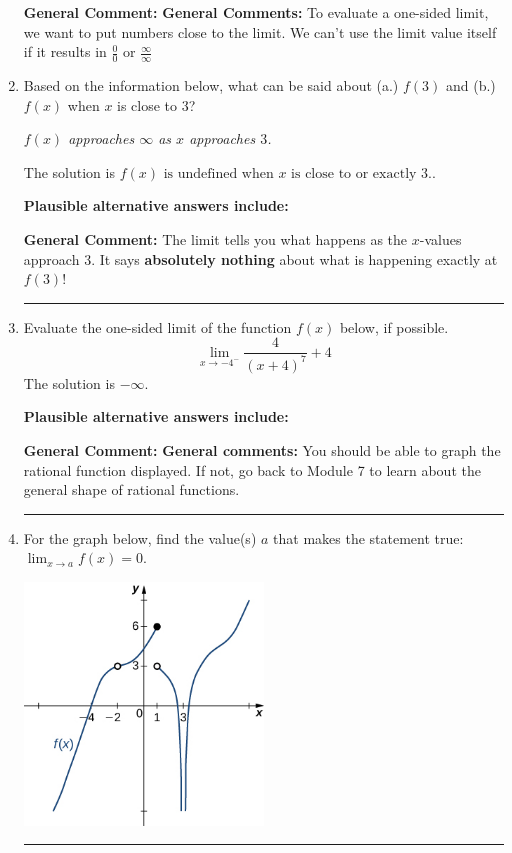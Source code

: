 \documentclass{extbook}[14pt]
\newcommand{\litem}[1]{\item #1

\rule{\textwidth}{0.4pt}}
\begin{document}
\begin{enumerate}
{\textbf{General Comment:} \textbf{General Comments:} To evaluate a one-sided limit, we want to put numbers close to the limit. We can't use the limit value itself if it results in $\frac{0}{0}$ or $\frac{\infty}{\infty}$
}
\litem{
Based on the information below, what can be said about (a.) $f(3)$ and (b.) $f(x)$ when $x$ is close to $3$?

\begin{center}
    \textit{ $f(x)$ approaches $\infty$ as $x$ approaches $3$. }
\end{center}
The solution is \( f(x) \text{ is undefined when } x \text{ is close to or exactly } 3. \).\begin{enumerate}[label=\Alph*.]
\textbf{Plausible alternative answers include:}




\end{enumerate}

\textbf{General Comment:} The limit tells you what happens as the $x$-values approach $3$. It says \textbf{absolutely nothing} about what is happening exactly at $f(3)$!
}
\litem{
Evaluate the one-sided limit of the function $f(x)$ below, if possible.
\[ \lim_{x \rightarrow -4^-} \frac{4}{(x+4)^7}+4 \]The solution is \( -\infty \).\begin{enumerate}[label=\Alph*.]
\textbf{Plausible alternative answers include:}




\end{enumerate}

\textbf{General Comment:} \textbf{General comments:} You should be able to graph the rational function displayed. If not, go back to Module 7 to learn about the general shape of rational functions.
}
\litem{
For the graph below, find the value(s) $a$ that makes the statement true: $ \displaystyle \lim_{x \rightarrow a} f(x) = 0$.

\begin{center}
    \includegraphics[width=0.5\textwidth]{../Figures/evaluateLimitGraphicallyCopyC.png}
\end{center}


}
\end{enumerate}
\end{document}
